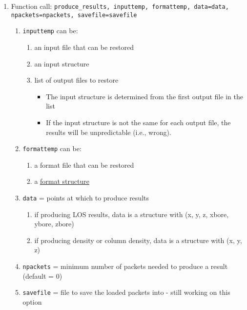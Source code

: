 \documentclass[11pt]{article}
\begin{document}
\begin{enumerate}
\item Function call: \texttt{produce\_results, inputtemp, formattemp, 
  data=data, npackets=npackets, savefile=savefile}
  \begin{enumerate}
  \item \texttt{inputtemp} can be:
    \begin{enumerate}
    \item an input file that can be restored
    \item an input structure
    \item list of output files to restore 
      \begin{itemize}
      \item The input structure is determined from the first output file in 
	the list
      \item If the input structure is not the same for each output file, the 
	results will be unpredictable (i.e., wrong).
      \end{itemize}
    \end{enumerate}
  \item \texttt{formattemp} can be:
    \begin{enumerate}
    \item a format file that can be restored
    \item a \hyperref[format]{format structure}
    \end{enumerate}
  \item \texttt{data} = points at which to produce results
    \begin{enumerate}
    \item if producing LOS results, data is a structure with (x, y, z, xbore, 
      ybore, zbore)
    \item if producing density or column density, data is a structure with 
      (x, y, z)
    \end{enumerate}
  \item \texttt{npackets} = minimum number of packets needed to produce a 
    result (default = 0)
  \item \texttt{savefile} = file to save the loaded packets into - still 
    working on this option
  \end{enumerate}


\end{enumerate}
\end{document}
